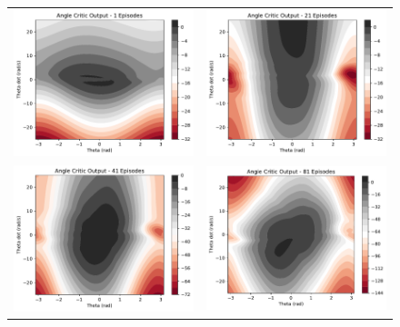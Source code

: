 \begin{figure}[H]
	\begin{tabular}{cc}
		\includegraphics[width=65mm]{figures/train_figs/angle_critic/Critic0_1.pdf} &  
		\includegraphics[width=65mm]{figures/train_figs/angle_critic/Critic0_21.pdf} \\
		\includegraphics[width=65mm]{figures/train_figs/angle_critic/Critic0_41.pdf} &   \includegraphics[width=65mm]{figures/train_figs/angle_critic/Critic0_81.pdf} \\

\end{tabular}
\end{figure}
